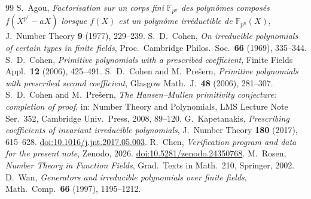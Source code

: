 \documentclass[11pt,a4paper]{amsart}
\theoremstyle{remark}
\newcommand{\F}{\mathbb{F}}
\begin{document}
\begin{thebibliography}{99}
 S.~Agou, \emph{Factorisation sur un corps fini $\F_{p^n}$ des polyn\^omes compos\'es
$f(X^{p^r}-aX)$ lorsque $f(X)$ est un polyn\^ome irr\'eductible de $\F_{p^n}(X)$}, J.~Number Theory
\textbf{9} (1977), 229--239.
 S.~D.~Cohen, \emph{On irreducible polynomials of certain types in finite fields}, Proc.\
Cambridge Philos.\ Soc.\ \textbf{66} (1969), 335--344.
 S.~D.~Cohen, \emph{Primitive polynomials with a prescribed coefficient}, Finite Fields Appl.\
\textbf{12} (2006), 425--491.
\bibitem{CP1} S.~D.~Cohen and M.~Pre\v{s}ern, \emph{Primitive polynomials with prescribed second coefficient},
Glasgow Math.\ J.\ \textbf{48} (2006), 281--307.
\bibitem{CP2} S.~D.~Cohen and M.~Pre\v{s}ern, \emph{The Hansen--Mullen primitivity conjecture: completion of
proof}, in: Number Theory and Polynomials, LMS Lecture Note Ser.\ 352, Cambridge Univ.\ Press, 2008, 89--120.
\bibitem{K} G.~Kapetanakis, \emph{Prescribing coefficients of invariant irreducible polynomials},
J.~Number Theory \textbf{180} (2017), 615--628.
\href{https://doi.org/10.1016/j.jnt.2017.05.003}{doi:10.1016/j.jnt.2017.05.003}.
\bibitem{Repo} R.~Chen, \emph{Verification program and data for the present note}, Zenodo, 2026.
\href{https://doi.org/10.5281/zenodo.24350768}{doi:10.5281/zenodo.24350768}.
\bibitem{Ro} M.~Rosen, \emph{Number Theory in Function Fields}, Grad.\ Texts in Math.\ 210, Springer, 2002.
\bibitem{Wa} D.~Wan, \emph{Generators and irreducible polynomials over finite fields}, Math.\ Comp.\
\textbf{66} (1997), 1195--1212.
\end{thebibliography}
\end{document}

